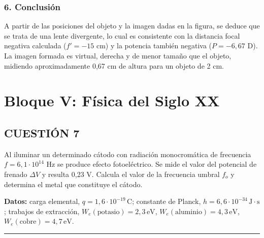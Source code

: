 \subsubsection*{6. Conclusión}
\begin{cajaconclusion}
A partir de las posiciones del objeto y la imagen dadas en la figura, se deduce que se trata de una lente divergente, lo cual es consistente con la distancia focal negativa calculada ($f'=-15$ cm) y la potencia también negativa ($P=-6,67$ D). La imagen formada es virtual, derecha y de menor tamaño que el objeto, midiendo aproximadamente 0,67 cm de altura para un objeto de 2 cm.
\end{cajaconclusion}

\newpage

\section{Bloque V: Física del Siglo XX}
\label{sec:fisSXX_2022_jun_ord}

\subsection{CUESTIÓN 7}
\label{subsec:C7_2022_jun_ord}

\begin{cajaenunciado}
Al iluminar un determinado cátodo con radiación monocromática de frecuencia $f=6,1\cdot10^{14}$ Hz se produce efecto fotoeléctrico. Se mide el valor del potencial de frenado $\Delta V$ y resulta 0,23 V. Calcula el valor de la frecuencia umbral $f_{o}$ y determina el metal que constituye el cátodo.

\textbf{Datos:} carga elemental, $q=1,6\cdot10^{-19}\,\text{C}$; constante de Planck, $h=6,6\cdot10^{-34}\,\text{J}\cdot\text{s}$; trabajos de extracción, $W_{e}(\text{potasio})=2,3\,\text{eV}$, $W_{e}(\text{aluminio})=4,3\,\text{eV}$, $W_{e}(\text{cobre})=4,7\,\text{eV}$.
\end{cajaenunciado}
\hrule

